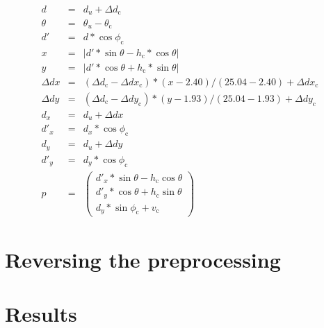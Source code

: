 \documentclass[english]{article}
\begin{document}
\begin{eqnarray}
  d &=& d_u + \Delta d_{\mbox{c}} \nonumber \\
  \theta &=& \theta_u - \theta_{\mbox{c}} \nonumber \\
  d' &=& d * \cos{\phi_{\mbox{c}}} \nonumber \\
  x &=& |d' * \sin{\theta} - h_{\mbox{c}} * \cos{\theta}| \nonumber \\
  y &=& |d' * \cos{\theta} + h_{\mbox{c}} * \sin{\theta}| \nonumber \\
  \Delta dx &=& (\Delta d_{\mbox{c}} - \Delta dx_{\mbox{c}}) * (x - 2.40) / (25.04 - 2.40) + \Delta dx_{\mbox{c}} \nonumber \\
  \Delta dy &=& (\Delta d_{\mbox{c}} - \Delta dy_{\mbox{c}}) * (y - 1.93) / (25.04 - 1.93) + \Delta dy_{\mbox{c}} \nonumber \\
  d_x &=& d_u + \Delta dx \nonumber \\
  d'_x &=& d_x * \cos{\phi_{\mbox{c}}} \nonumber \\
  d_y &=& d_u + \Delta dy \nonumber \\
  d'_y &=& d_y * \cos{\phi_{\mbox{c}}} \nonumber \\
  p &=&  \left(
           \begin{array}{c}
             d'_x * \sin{\theta} - h_{\mbox{c}} \cos{\theta} \nonumber \\
             d'_y * \cos{\theta} + h_{\mbox{c}} \sin{\theta} \nonumber \\
             d_y * \sin{\phi_{\mbox{c}}} + v_{\mbox{c}}
           \end{array}
         \right)
\end{eqnarray}





\section{Reversing the preprocessing}

\section{Results}



\end{document}
